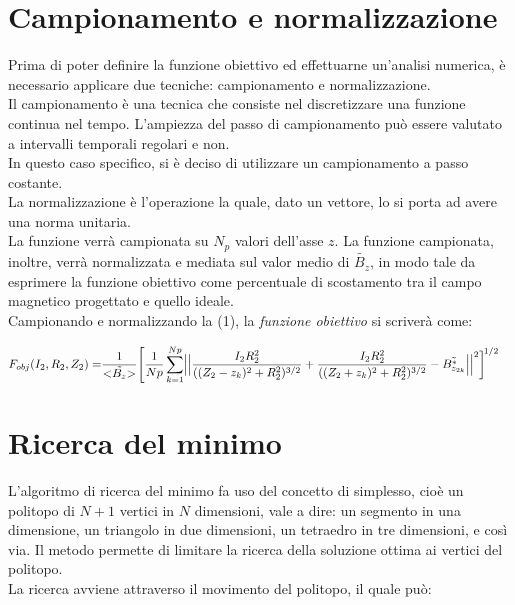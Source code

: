 \documentclass[a4paper, 11pt]{article}
\begin{document}
\section*{Campionamento e normalizzazione}

Prima di poter definire la funzione obiettivo ed effettuarne un'analisi
numerica, è necessario applicare due tecniche: campionamento e normalizzazione.
\\
Il campionamento è una tecnica che consiste nel discretizzare una funzione
continua nel tempo. L'ampiezza del passo di campionamento può essere valutato a
intervalli temporali regolari e non. \\
In questo caso specifico, si è deciso di utilizzare un campionamento a passo
costante. \\
La normalizzazione è l'operazione la quale, dato un vettore, lo si porta ad
avere una norma unitaria. \\
La funzione verrà campionata su $N_{p}$ valori dell'asse $z$. La funzione
campionata, inoltre, verrà normalizzata e mediata sul valor medio di
$\tilde{B_{z}}$, in modo tale da esprimere la funzione obiettivo come
percentuale di scostamento tra il campo magnetico progettato e quello ideale. \\
Campionando e normalizzando la (1), la \emph{funzione obiettivo} si scriverà
come:
 
\begin{equation}
    \begin{split}
        F_{obj}(I_{2},R_{2},Z_{2}) =
        & \frac{1}{{\tiny <} \tilde{B_{z}}{\tiny >}} \Biggl[ \frac{1}{Np} \sum\limits_{k=1}^{Np} \Bigl|\Bigl|\frac{I_{2}R_{2}^{2}}{((Z_{2}-z_{k})^{2}+R_{2}^{2})^{3/2}}+\frac{I_{2}R_{2}^{2}}{((Z_{2}+z_{k})^{2}+R_{2}^{2})^{3/2}}-\tilde{B^*_{z_{2k}}}\Bigr|\Bigr|^{2}\biggr]^{\!1/2}
    \end{split} 
\end{equation}
\noindent

\section* {Ricerca del minimo}

L'algoritmo di ricerca del minimo fa uso del concetto di simplesso, cioè un
politopo di $N+1$ vertici in $N$ dimensioni, vale a dire: un segmento in una
dimensione, un triangolo in due dimensioni, un tetraedro in tre dimensioni, e
così via. Il metodo permette di limitare la ricerca della soluzione ottima ai
vertici del politopo. \\
La ricerca avviene attraverso il movimento del politopo, il quale può:
\end{document}
